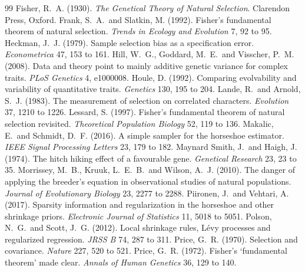 \begin{small}
\begin{thebibliography}{99}
 Fisher, R.\ A. (1930). \emph{The Genetical Theory of Natural Selection}. Clarendon Press, Oxford.
 Frank, S.\ A.\ and Slatkin, M. (1992). Fisher's fundamental theorem of natural selection. \emph{Trends in Ecology and Evolution} 7, 92 to 95.
 Heckman, J.\ J. (1979). Sample selection bias as a specification error. \emph{Econometrica} 47, 153 to 161.
 Hill, W.\ G., Goddard, M.\ E.\ and Visscher, P.\ M. (2008). Data and theory point to mainly additive genetic variance for complex traits. \emph{PLoS Genetics} 4, e1000008.
 Houle, D. (1992). Comparing evolvability and variability of quantitative traits. \emph{Genetics} 130, 195 to 204.
 Lande, R.\ and Arnold, S.\ J. (1983). The measurement of selection on correlated characters. \emph{Evolution} 37, 1210 to 1226.
 Lessard, S. (1997). Fisher's fundamental theorem of natural selection revisited. \emph{Theoretical Population Biology} 52, 119 to 136.
 Makalic, E.\ and Schmidt, D.\ F. (2016). A simple sampler for the horseshoe estimator. \emph{IEEE Signal Processing Letters} 23, 179 to 182.
 Maynard Smith, J.\ and Haigh, J. (1974). The hitch hiking effect of a favourable gene. \emph{Genetical Research} 23, 23 to 35.
 Morrissey, M.\ B., Kruuk, L.\ E.\ B.\ and Wilson, A.\ J. (2010). The danger of applying the breeder's equation in observational studies of natural populations. \emph{Journal of Evolutionary Biology} 23, 2277 to 2288.
 Piironen, J.\ and Vehtari, A. (2017). Sparsity information and regularization in the horseshoe and other shrinkage priors. \emph{Electronic Journal of Statistics} 11, 5018 to 5051.
 Polson, N.\ G.\ and Scott, J.\ G. (2012). Local shrinkage rules, L\'evy processes and regularized regression. \emph{JRSS B} 74, 287 to 311.
 Price, G.\ R. (1970). Selection and covariance. \emph{Nature} 227, 520 to 521.
 Price, G.\ R. (1972). Fisher's `fundamental theorem' made clear. \emph{Annals of Human Genetics} 36, 129 to 140.

\end{thebibliography}
\end{small}
